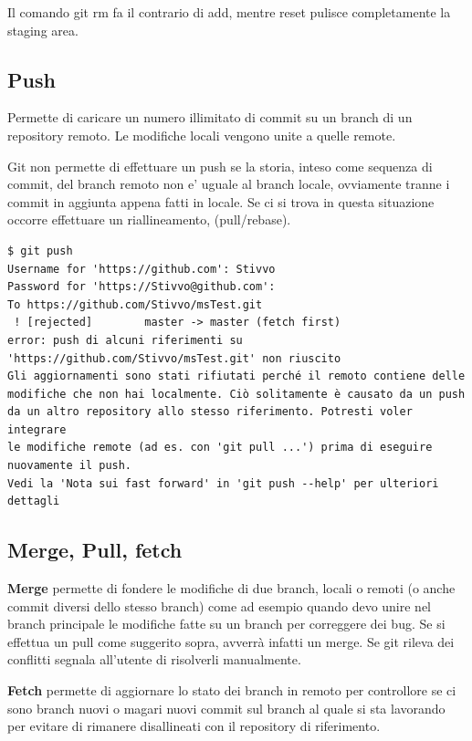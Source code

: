 \documentclass{article} \usepackage[textwidth=18cm,textheight=18cm]{geometry}
\begin{document}
Il comando git rm fa il contrario di add, mentre reset pulisce completamente la
staging area.

\subsection{Push}

Permette di caricare un numero illimitato di commit su un branch di un
repository remoto. Le modifiche locali vengono unite a quelle remote.

Git non permette di effettuare un push se la storia, inteso come sequenza di commit,
del branch remoto non e' uguale al branch locale, ovviamente tranne i commit in aggiunta
appena fatti in locale. Se ci si trova in questa situazione occorre effettuare un riallineamento,
(pull/rebase).

\begin{verbatim}
$ git push
Username for 'https://github.com': Stivvo
Password for 'https://Stivvo@github.com':
To https://github.com/Stivvo/msTest.git
 ! [rejected]        master -> master (fetch first)
error: push di alcuni riferimenti su 'https://github.com/Stivvo/msTest.git' non riuscito
Gli aggiornamenti sono stati rifiutati perché il remoto contiene delle
modifiche che non hai localmente. Ciò solitamente è causato da un push
da un altro repository allo stesso riferimento. Potresti voler integrare
le modifiche remote (ad es. con 'git pull ...') prima di eseguire
nuovamente il push.
Vedi la 'Nota sui fast forward' in 'git push --help' per ulteriori
dettagli
\end{verbatim}

\subsection{Merge, Pull, fetch}

\textbf{Merge} permette di fondere le modifiche di due branch, locali o remoti (o anche
commit diversi dello stesso branch) come ad esempio quando devo unire nel branch principale
le modifiche fatte su un branch per correggere dei bug. Se si effettua un pull come suggerito
sopra, avverrà infatti un merge. Se git rileva dei conflitti segnala all'utente
di risolverli manualmente. 

\textbf{Fetch} permette di aggiornare lo stato dei branch in remoto per controllore
se ci sono branch nuovi o magari nuovi commit sul branch al quale si sta lavorando per evitare
di rimanere disallineati con il repository di riferimento.
\end{document}
